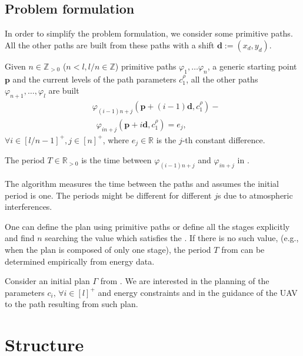 \subsection{Problem formulation}

In order to simplify the problem formulation, we consider some primitive paths. All the other paths are built from these paths with a shift $\mathbf{d}:=(x_d,y_d)$.

Given $n\in\mathbb{Z}_{>0}$ ($n<l,l/n\in\mathbb{Z}$) primitive paths $\varphi_1,\dots\varphi_n$, a generic starting point $\mathbf{p}$ and the current levels of the path parameters $c_1^\rho$, all the other paths $\varphi_{n+1},\dots,\varphi_l$ are built
\begin{equation}\label{eq:primitive}\begin{split}
  &\varphi_{(i-1)n+j}(\mathbf{p}+(i-1)\mathbf{d},c_1^\rho)-\\ &\,\,\,\varphi_{in+j}(\mathbf{p}+i\mathbf{d},c_1^\rho)=e_j,
\end{split}\end{equation}
$\forall i\in[l/n-1]^+,j\in[n]^+$, where $e_j\in\mathbb{R}$ is the $j$-th constant difference.

\begin{highlight}
\begin{defn}[Period]\label{def:period}
  The period $T\in\mathbb{R}_{> 0}$ is the time between $\varphi_{(i-1)n+j}$ and $\varphi_{in+j}$ in .
\end{defn} 
\end{highlight}

The algorithm measures the time between the paths and assumes the initial period is one. The periods might be different for different $j$s due to atmospheric interferences.

One can define the plan using primitive paths or define all the stages explicitly and find $n$ searching the value which satisfies the . If there is no such value, (e.g., when the plan is composed of only one stage), the period $T$ from  can be determined empirically from energy data.

\begin{highlight}
\begin{pb}\label{pb}
  Consider an initial plan $\Gamma$ from . We are interested in the planning of the parameters $c_i,\,\forall i\in[l]^+$ and energy constraints and in the guidance of the UAV to the path resulting from such plan.
\end{pb}    
\end{highlight}

\section{Structure}


